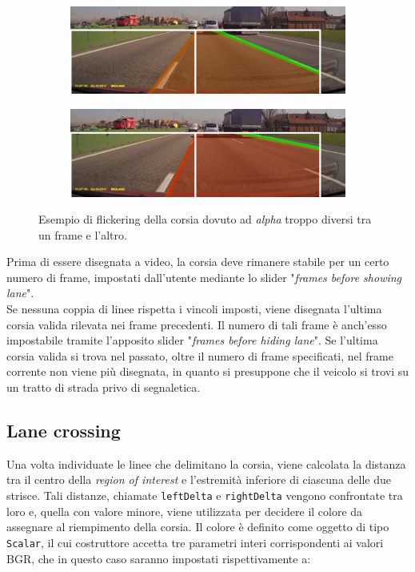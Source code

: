 \documentclass[12pt]{article}
\begin{document}
\begin{figure}[htbp]
\centering
\begin{subfigure}[b]{0.4\textwidth}
        \includegraphics[width=\textwidth]{flickerCorsia1.png}
    \end{subfigure}
    \begin{subfigure}[b]{0.4\textwidth}
        \includegraphics[width=\textwidth]{flickerCorsia2.png}
    \end{subfigure}
\caption{Esempio di flickering della corsia dovuto ad \textit{alpha} troppo diversi tra un frame e l'altro.}
\end{figure}

\hspace{0.2 cm} Prima di essere disegnata a video, la corsia deve rimanere stabile per un certo numero di frame, impostati dall'utente mediante lo slider "\textit{frames before showing lane}".\\
Se nessuna coppia di linee rispetta i vincoli imposti, viene disegnata l'ultima corsia valida rilevata nei frame precedenti. Il numero di tali frame è anch'esso impostabile tramite l'apposito slider "\textit{frames before hiding lane}". Se l'ultima corsia valida si trova nel passato, oltre il numero di frame specificati, nel frame corrente non viene più disegnata, in quanto si presuppone che il veicolo si trovi su un tratto di strada privo di segnaletica.

\subsection{Lane crossing}
\hspace{0.2 cm} Una volta individuate le linee che delimitano la corsia, viene calcolata la distanza tra il centro della \textit{region of interest} e l'estremità inferiore di ciascuna delle due strisce. Tali distanze, chiamate \texttt{leftDelta} e \texttt{rightDelta} vengono confrontate tra loro e, quella con valore minore, viene utilizzata per decidere il colore da assegnare al riempimento della corsia.
Il colore è definito come oggetto di tipo \texttt{Scalar}, il cui costruttore accetta tre parametri interi corrispondenti ai valori BGR, che in questo caso saranno impostati rispettivamente a:
\end{document}
